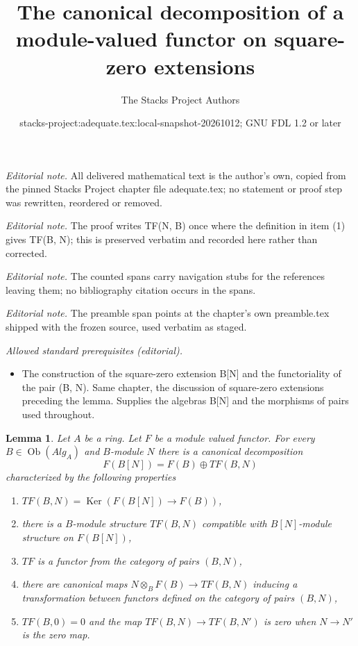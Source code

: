\documentclass{stacks-project}
\title{The canonical decomposition of a module-valued functor on square-zero extensions}
\author{The Stacks Project Authors}
\date{stacks-project:adequate.tex:local-snapshot-20261012; GNU FDL 1.2 or later}
\theoremstyle{plain}
\newtheorem{lemma}[subsection]{Lemma}
\theoremstyle{definition}
\theoremstyle{remark}
\numberwithin{equation}{subsection}
\def\Ob{\mathop{\mathrm{Ob}}\nolimits}
\def\Ker{\mathop{\mathrm{Ker}}}
\begin{document}
\maketitle
\noindent\textit{Editorial note.} All delivered mathematical text is the author's own, copied from the pinned Stacks Project chapter file adequate.tex; no statement or proof step was rewritten, reordered or removed.\par\medskip
\noindent\textit{Editorial note.} The proof writes TF(N, B) once where the definition in item (1) gives TF(B, N); this is preserved verbatim and recorded here rather than corrected.\par\medskip
\noindent\textit{Editorial note.} The counted spans carry navigation stubs for the references leaving them; no bibliography citation occurs in the spans.\par\medskip
\noindent\textit{Editorial note.} The preamble span points at the chapter's own preamble.tex shipped with the frozen source, used verbatim as staged.\par\medskip
\noindent\textit{Allowed standard prerequisites (editorial).}\begin{itemize}
\item The construction of the square-zero extension B[N] and the functoriality of the pair (B, N). Same chapter, the discussion of square-zero extensions preceding the lemma. Supplies the algebras B[N] and the morphisms of pairs used throughout.
\end{itemize}\medskip
\begin{lemma}
\label{lemma-tangent-functor}
Let $A$ be a ring. Let $F$ be a module valued functor.
For every $B \in \Ob(\textit{Alg}_A)$ and $B$-module $N$
there is a canonical decomposition
$$
F(B[N]) = F(B) \oplus TF(B, N)
$$
characterized by the following properties
\begin{enumerate}
\item $TF(B, N) = \Ker(F(B[N]) \to F(B))$,
\item there is a $B$-module structure $TF(B, N)$
compatible with $B[N]$-module structure on $F(B[N])$,
\item $TF$ is a functor from the category of pairs $(B, N)$,
\item
\label{item-mult-map}
there are canonical maps $N \otimes_B F(B) \to TF(B, N)$
inducing a transformation between functors defined on the category
of pairs $(B, N)$,
\item $TF(B, 0) = 0$ and the map $TF(B, N) \to TF(B, N')$ is
zero when $N \to N'$ is the zero map.
\end{enumerate}
\end{lemma}
\end{document}
